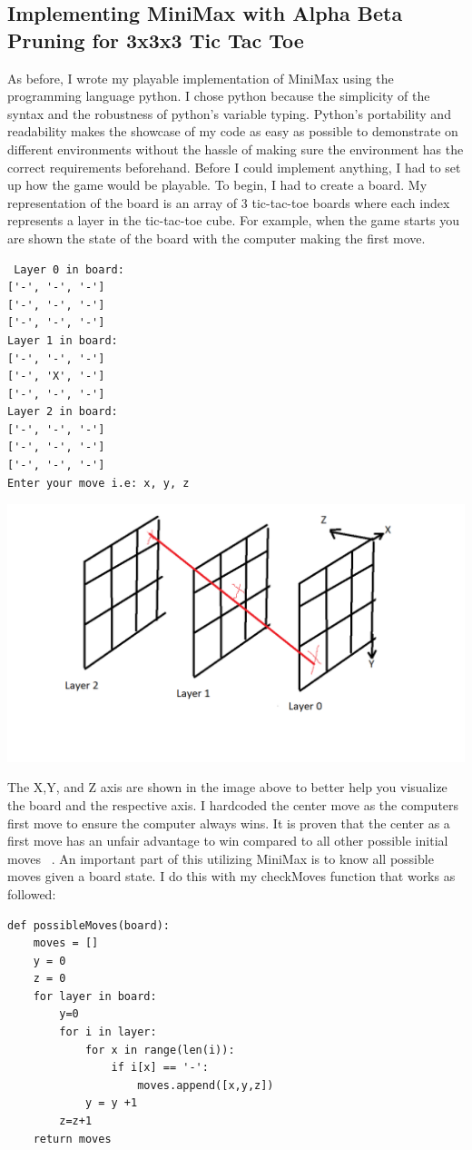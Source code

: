 \documentclass[letterpaper]{article}
\begin{document}
\subsection{Implementing MiniMax with Alpha Beta Pruning for 3x3x3 Tic Tac Toe}
As before, I wrote my playable implementation of MiniMax using the programming language python. I chose python because the simplicity of the syntax and the robustness of python's variable typing. Python's portability and readability makes the showcase of my code as easy as possible to demonstrate on different environments without the hassle of making sure the environment has the correct requirements beforehand. Before I could implement anything, I had to set up how the game would be playable. To begin, I had to create a board. My representation of the board is an array of 3 tic-tac-toe boards where each index represents a layer in the tic-tac-toe cube. For example, when the game starts you are shown the state of the board with the computer making the first move.
\begin{lstlisting}
 Layer 0 in board:
['-', '-', '-']
['-', '-', '-']
['-', '-', '-']
Layer 1 in board:
['-', '-', '-']
['-', 'X', '-']
['-', '-', '-']
Layer 2 in board:
['-', '-', '-']
['-', '-', '-']
['-', '-', '-']
Enter your move i.e: x, y, z
\end{lstlisting}
\includegraphics [scale=0.2] {board}

The X,Y, and Z axis are shown in the image above to better help you visualize the board and the respective axis. I hardcoded the center move as the computers first move to ensure the computer always wins. It is proven that the center as a first move has an unfair advantage to win compared to all other possible initial moves ~\cite{felstiner2019}. An important part of this utilizing MiniMax is to know all possible moves given a board state. I do this with my checkMoves function that works as followed:
\begin{lstlisting}
def possibleMoves(board):
    moves = []
    y = 0
    z = 0
    for layer in board:
        y=0
        for i in layer:
            for x in range(len(i)):
                if i[x] == '-':
                    moves.append([x,y,z])
            y = y +1
        z=z+1
    return moves 
\end{lstlisting}
\end{document}
